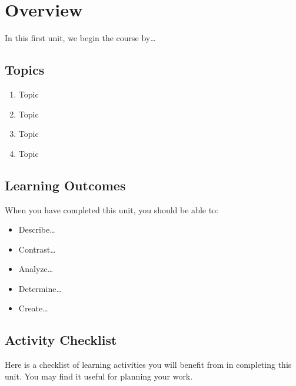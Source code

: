 \documentclass[
]{book}
\providecommand{\tightlist}{%
  \setlength{\itemsep}{0pt}\setlength{\parskip}{0pt}}
\begin{document}
\hypertarget{overview-12}{%
\section*{Overview}\label{overview-12}}

In this first unit, we begin the course by\ldots{}

\hypertarget{topics-12}{%
\subsection*{Topics}\label{topics-12}}

\begin{enumerate}
\def\labelenumi{\arabic{enumi}.}
\tightlist
\item
  Topic\\
\item
  Topic\\
\item
  Topic\\
\item
  Topic
\end{enumerate}

\hypertarget{learning-outcomes-12}{%
\subsection*{Learning Outcomes}\label{learning-outcomes-12}}

When you have completed this unit, you should be able to:

\begin{itemize}
\tightlist
\item
  Describe\ldots{}
\item
  Contrast\ldots{}
\item
  Analyze\ldots{}
\item
  Determine\ldots{}
\item
  Create\ldots{}
\end{itemize}

\hypertarget{activity-checklist-13}{%
\subsection*{Activity Checklist}\label{activity-checklist-13}}

Here is a checklist of learning activities you will benefit from in completing this unit. You may find it useful for planning your work.
\end{document}
